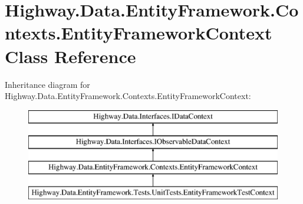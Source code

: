 \hypertarget{class_highway_1_1_data_1_1_entity_framework_1_1_contexts_1_1_entity_framework_context}{\section{Highway.\-Data.\-Entity\-Framework.\-Contexts.\-Entity\-Framework\-Context Class Reference}
\label{class_highway_1_1_data_1_1_entity_framework_1_1_contexts_1_1_entity_framework_context}
}
Inheritance diagram for Highway.\-Data.\-Entity\-Framework.\-Contexts.\-Entity\-Framework\-Context\-:\begin{figure}[H]
\begin{center}
\leavevmode
\includegraphics[height=4.000000cm]{class_highway_1_1_data_1_1_entity_framework_1_1_contexts_1_1_entity_framework_context}
\end{center}
\end{figure}
